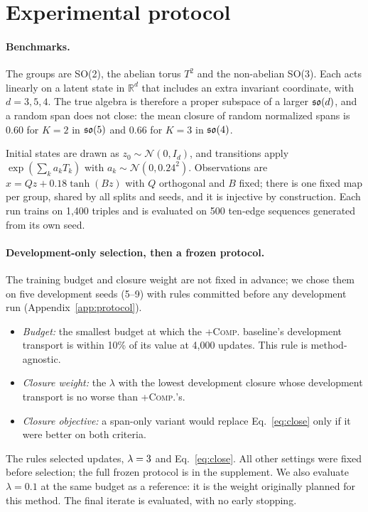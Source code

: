 \section{Experimental protocol}\label{sec:protocol}
\paragraph{Benchmarks.}
The groups are SO(2), the abelian torus $T^2$ and the non-abelian SO(3). Each acts linearly on a latent state in
$\mathbb R^d$ that includes an extra invariant coordinate, with $d=3,5,4$. The true algebra is therefore a proper
subspace of a larger $\mathfrak{so}(d)$, and a random span does not close: the mean closure of random normalized spans is
$0.60$ for $K{=}2$ in $\mathfrak{so}(5)$ and $0.66$ for $K{=}3$ in $\mathfrak{so}(4)$.

Initial states are drawn as $z_0\sim\mathcal N(0,I_d)$, and transitions apply $\exp(\sum_k a_kT_k)$ with
$a_k\sim\mathcal N(0,0.24^2)$. Observations are $x=Qz+0.18\tanh(Bz)$ with $Q$ orthogonal and $B$ fixed; there is
one fixed map per group, shared by all splits and seeds, and it is injective by construction. Each run trains on
1{,}400 triples and is evaluated on 500 ten-edge sequences generated from its own seed.

\paragraph{Development-only selection, then a frozen protocol.}
The training budget and closure weight are not fixed in advance; we chose them on five development seeds
(5--9) with rules committed before any development run (Appendix~\ref{app:protocol}).
\begin{itemize}
\item \emph{Budget:} the smallest budget at which the \textsc{+Comp.} baseline's development transport is within
10\% of its value at 4{,}000 updates. This rule is method-agnostic.
\item \emph{Closure weight:} the $\lambda$ with the lowest development closure whose development transport is no
worse than \textsc{+Comp.}'s.
\item \emph{Closure objective:} a span-only variant would replace Eq.~\eqref{eq:close} only if it were better on
both criteria.
\end{itemize}
The rules selected \NSteps{} updates, $\lambda=3$ and Eq.~\eqref{eq:close}. All other settings were fixed
before selection; the full frozen protocol is in the supplement. We also evaluate $\lambda=0.1$ at the same budget
as a reference: it is the weight originally planned for this method. The final iterate is evaluated, with no early
stopping.

